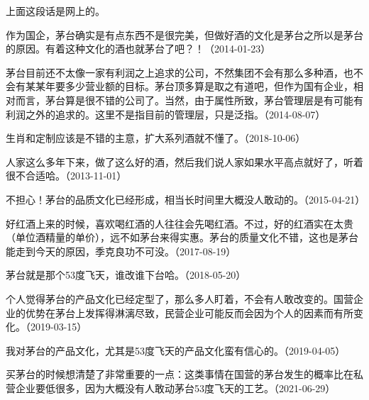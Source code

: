 上面这段话是网上的。

作为国企，茅台确实是有点东西不是很完美，但做好酒的文化是茅台之所以是茅台的原因。有着这种文化的酒也就茅台了吧？！（2014-01-23）


茅台目前还不太像一家有利润之上追求的公司，不然集团不会有那么多种酒，也不会有某某年要多少营业额的目标。茅台顶多算是取之有道吧，但作为国有企业，相对而言，茅台算是很不错的公司了。当然，由于属性所致，茅台管理层是有可能有利润之外的追求的。这里不是指目前的管理层，只是泛指。（2014-08-07）


生肖和定制应该是不错的主意，扩大系列酒就不懂了。（2018-10-06）


人家这么多年下来，做了这么好的酒，然后我们说人家如果水平高点就好了，听着很不合适哈。（2013-11-01）


不担心！茅台的品质文化已经形成，相当长时间里大概没人敢动的。（2015-04-21）


好红酒上来的时候，喜欢喝红酒的人往往会先喝红酒。不过，好的红酒实在太贵（单位酒精量的单价），远不如茅台来得实惠。茅台的质量文化不错，这也是茅台能走到今天的原因，季克良功不可没。（2017-08-19）


茅台就是那个53度飞天，谁改谁下台哈。（2018-05-20）

个人觉得茅台的产品文化已经定型了，那么多人盯着，不会有人敢改变的。国营企业的优势在茅台上发挥得淋漓尽致，民营企业可能反而会因为个人的因素而有所变化。（2019-03-15）

我对茅台的产品文化，尤其是53度飞天的产品文化蛮有信心的。（2019-04-05）


买茅台的时候想清楚了非常重要的一点：这类事情在国营的茅台发生的概率比在私营企业要低很多，因为大概没有人敢动茅台53度飞天的工艺。（2021-06-29）

